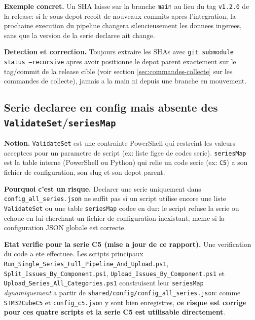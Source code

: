 \documentclass[11pt,a4paper]{article}
\begin{document}
\textbf{Exemple concret.} Un SHA laisse sur la branche \texttt{main} au lieu du
tag \texttt{v1.2.0} de la release: si le sous-depot recoit de nouveaux commits
apres l'integration, la prochaine execution du pipeline changera silencieusement
les donnees ingerees, sans que la version de la serie declaree ait change.

\textbf{Detection et correction.} Toujours extraire les SHAs avec
\texttt{git submodule status --recursive} apres avoir positionne le depot parent
exactement sur le tag/commit de la release cible (voir section
\ref{sec:commandes-collecte} sur les commandes de collecte), jamais a la main
ni depuis une branche en mouvement.

\subsection{Serie declaree en config mais absente des \texttt{ValidateSet}/\texttt{seriesMap}}
\textbf{Notion.} \texttt{ValidateSet} est une contrainte PowerShell qui restreint
les valeurs acceptees pour un parametre de script (ex: liste figee de codes
serie). \texttt{seriesMap} est la table interne (PowerShell ou Python) qui relie
un code serie (ex: \texttt{C5}) a son fichier de configuration, son slug et son
depot parent.

\textbf{Pourquoi c'est un risque.} Declarer une serie uniquement dans
\texttt{config\_all\_series.json} ne suffit pas si un script utilise encore une
liste \texttt{ValidateSet} ou une table \texttt{seriesMap} codee en dur: le
script refuse la serie ou echoue en lui cherchant un fichier de configuration
inexistant, meme si la configuration JSON globale est correcte.

\textbf{Etat verifie pour la serie C5 (mise a jour de ce rapport).} Une
verification du code a ete effectuee. Les scripts principaux
\texttt{Run\_Single\_Series\_Full\_Pipeline\_And\_Upload.ps1},
\texttt{Split\_Issues\_By\_Component.ps1}, \texttt{Upload\_Issues\_By\_Component.ps1}
et \texttt{Upload\_Series\_All\_Categories.ps1} construisent leur
\texttt{seriesMap} \emph{dynamiquement} a partir de
\texttt{shared/config/config\_all\_series.json}: comme \texttt{STM32CubeC5} et
\texttt{config\_c5.json} y sont bien enregistres, \textbf{ce risque est corrige
pour ces quatre scripts et la serie C5 est utilisable directement}.
\end{document}

